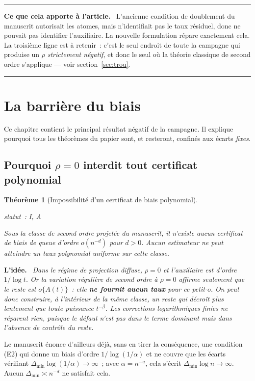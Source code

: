 \documentclass[11pt]{article}
\theoremstyle{plain}
\newtheorem{theoreme}{Théorème}[section]
\theoremstyle{definition}
\theoremstyle{remark}
\newcommand{\1}{\mathbf 1}
\newcommand{\statut}[1]{%
  \nopagebreak\par\nopagebreak
  \hfill{\normalfont\footnotesize\textcolor{gris}{statut~: #1}}%
  \par\nopagebreak\vspace{-2pt}}
\newenvironment{idee}
  {\par\medskip\noindent\textcolor{bleu}{\textbf{L'idée.}}\ \itshape}
  {\par\medskip}
\newenvironment{apport}
  {\par\medskip\noindent\begingroup\color{bleu}\rule{\linewidth}{0.6pt}\par
   \nobreak\vspace{2pt}\noindent\textbf{Ce que cela apporte à l'article.}\ \normalcolor}
  {\par\vspace{2pt}\noindent\textcolor{bleu}{\rule{\linewidth}{0.6pt}}\endgroup\par\medskip}
\begin{document}
\begin{apport}
L'ancienne condition de doublement du manuscrit autorisait les atomes,
mais n'identifiait pas le taux résiduel, donc ne pouvait pas identifier
l'auxiliaire. La nouvelle formulation répare exactement cela. La
troisième ligne est à retenir~: c'est le seul endroit de toute la
campagne qui produise un $\rho$ \emph{strictement négatif}, et donc le
seul où la théorie classique de second ordre s'applique --- voir
section~\ref{sec:trou}.
\end{apport}

\clearpage

\section{La barrière du biais}\label{ch:biais}

Ce chapitre contient le principal résultat négatif de la campagne. Il
explique pourquoi tous les théorèmes du papier sont, et resteront,
confinés aux écarts \emph{fixes}.

\subsection{Pourquoi \texorpdfstring{$\rho=0$}{rho=0} interdit tout certificat polynomial}

\begin{theoreme}[Impossibilité d'un certificat de biais polynomial]
\label{thm:bias-imp}
\statut{I, A}
Sous la classe de second ordre projetée du manuscrit, il n'existe aucun
certificat de biais de queue d'ordre $o(n^{-d})$ pour $d>0$. Aucun
estimateur ne peut atteindre un taux polynomial uniforme sur cette
classe.
\end{theoreme}

\begin{idee}
Dans le régime de projection diffuse, $\rho=0$ et l'auxiliaire est
d'ordre $1/\log t$. Or la variation régulière de second ordre à $\rho=0$
affirme seulement que le reste est $o\{A(t)\}$~: elle \textbf{ne fournit
aucun taux} pour ce petit-$o$. On peut donc construire, à l'intérieur de
la même classe, un reste qui décroît plus lentement que \emph{toute}
puissance $t^{-\beta}$. Les corrections logarithmiques finies ne réparent
rien, puisque le défaut n'est pas dans le terme dominant mais dans
l'absence de contrôle du reste.
\end{idee}

\noindent
Le manuscrit énonce d'ailleurs déjà, sans en tirer la conséquence, une
condition (E2) qui donne un biais d'ordre $1/\log(1/\alpha)$ et ne couvre
que les écarts vérifiant $\Delta_{\min}\log(1/\alpha)\to\infty$~; avec
$\alpha=n^{-a}$, cela s'écrit $\Delta_{\min}\log n\to\infty$. Aucun
$\Delta_{\min}\asymp n^{-d}$ ne satisfait cela.
\end{document}
